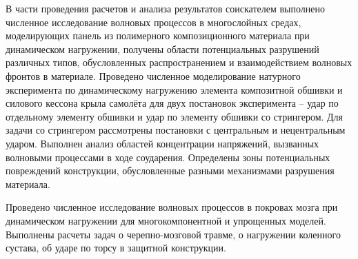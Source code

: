 В части проведения расчетов и анализа результатов соискателем выполнено численное исследование волновых процессов в многослойных средах, моделирующих панель из полимерного композиционного материала при динамическом нагружении, получены области потенциальных разрушений различных типов, обусловленных распространением и взаимодействием волновых фронтов в материале. Проведено численное моделирование натурного эксперимента по динамическому нагружению элемента композитной обшивки и силового кессона крыла самолёта для двух постановок эксперимента -- удар по отдельному элементу обшивки и удар по элементу обшивки со стрингером. Для задачи со стрингером рассмотрены постановки с центральным и нецентральным ударом. Выполнен анализ областей концентрации напряжений, вызванных волновыми процессами в ходе соударения. Определены зоны потенциальных повреждений конструкции, обусловленные разными механизмами разрушения материала.

Проведено численное исследование волновых процессов в покровах мозга при динамическом нагружении для многокомпонентной и упрощенных моделей. Выполнены расчеты задач о черепно-мозговой травме, о нагружении коленного сустава, об ударе по торсу в защитной конструкции.

